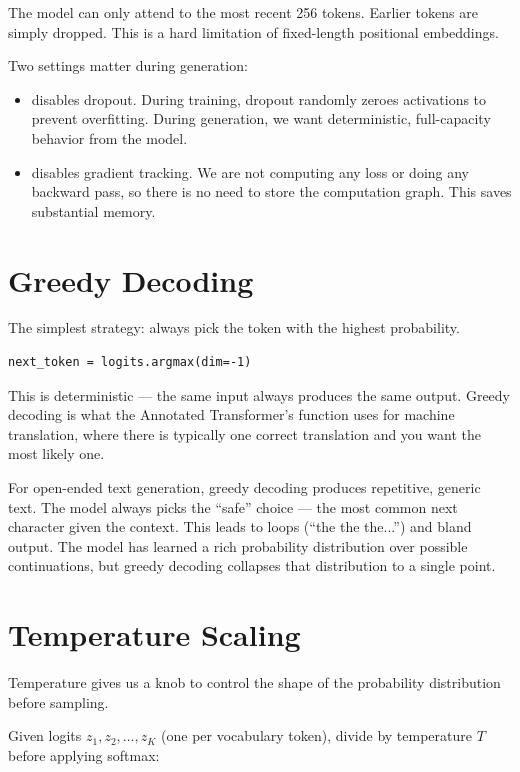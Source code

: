 The model can only attend to the most recent 256 tokens. Earlier tokens are simply dropped. This is a hard limitation of fixed-length positional embeddings.

Two settings matter during generation:

\begin{itemize}
  \item \textbf{} disables dropout. During training, dropout randomly zeroes activations to prevent overfitting. During generation, we want deterministic, full-capacity behavior from the model.
  \item \textbf{} disables gradient tracking. We are not computing any loss or doing any backward pass, so there is no need to store the computation graph. This saves substantial memory.
\end{itemize}

\section{Greedy Decoding}

The simplest strategy: always pick the token with the highest probability.

\concepttag
\begin{lstlisting}
next_token = logits.argmax(dim=-1)
\end{lstlisting}

This is deterministic --- the same input always produces the same output. Greedy decoding is what the Annotated Transformer's  function uses for machine translation, where there is typically one correct translation and you want the most likely one.

For open-ended text generation, greedy decoding produces repetitive, generic text. The model always picks the ``safe'' choice --- the most common next character given the context. This leads to loops (``the the the...'') and bland output. The model has learned a rich probability distribution over possible continuations, but greedy decoding collapses that distribution to a single point.

\section{Temperature Scaling}

Temperature gives us a knob to control the shape of the probability distribution before sampling.

Given logits $z_1, z_2, \ldots, z_K$ (one per vocabulary token), divide by temperature $T$ before applying softmax:

